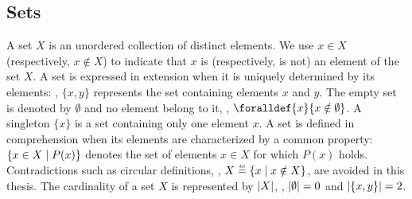 \subsection{Sets}


A set $X$ is an unordered collection of distinct elements. We use $x \in X$ (respectively, $x \notin X$) to indicate that $x$ is (respectively, is not) an element of the set $X$. A set is expressed in extension when it is uniquely determined by its elements: \eg, $\{x, y\}$ represents the set containing elements $x$ and $y$. The empty set is denoted by $\emptyset$ and no element belong to it, \ie, $\foralldef{x}{x \notin \emptyset}$.
A singleton $\{x\}$ is a set containing only one element $x$.
A set is defined in comprehension when its elements are characterized by a common property: $\{x \in X \mid P(x)\}$ denotes the set of elements $x\in X$ for which $P(x)$ holds.
Contradictions such as circular definitions, \eg, $X \defeq \setdef{x}{x \notin X}$, are avoided in this thesis.
The cardinality of a set $X$ is represented by $|X|$, \eg, $|\emptyset| = 0$ and $|\{x, y\}| = 2$.


